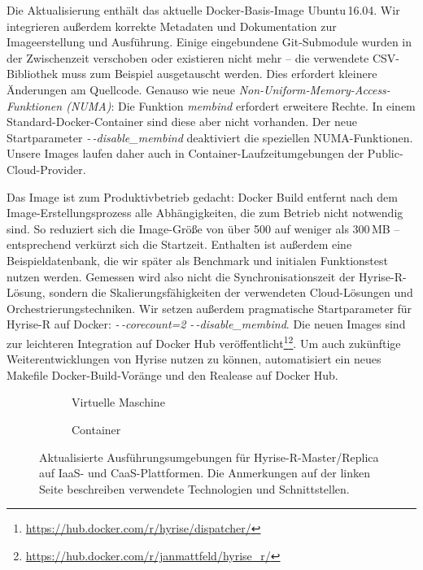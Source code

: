 Die Aktualisierung enthält das aktuelle Docker-Basis-Image Ubuntu\,16.04. Wir integrieren außerdem korrekte Metadaten und Dokumentation zur Imageerstellung und Ausführung. Einige eingebundene Git-Submodule wurden in der Zwischenzeit verschoben oder existieren nicht mehr -- die verwendete CSV-Bibliothek muss zum Beispiel ausgetauscht werden. Dies erfordert kleinere Änderungen am Quellcode. Genauso wie neue \emph{Non-Uniform-Memory-Access-Funktionen (NUMA)}: Die Funktion \emph{membind} erfordert erweitere Rechte. In einem Standard-Docker-Container sind diese aber nicht vorhanden. Der neue Startparameter \mbox{\emph{-\,-disable\_membind}} deaktiviert die speziellen NUMA-Funktionen. Unsere Images laufen daher auch in Container-Laufzeitumgebungen der Public-Cloud-Provider.

Das Image ist zum Produktivbetrieb gedacht: Docker Build entfernt nach dem Image-Erstellungsprozess alle Abhängigkeiten, die zum Betrieb nicht notwendig sind. So reduziert sich die Image-Größe von über 500 auf weniger als 300\,MB -- entsprechend verkürzt sich die Startzeit. Enthalten ist außerdem eine Beispieldatenbank, die wir später als Benchmark und initialen Funktionstest nutzen werden. Gemessen wird also nicht die Synchronisationszeit der Hyrise-R-Lösung, sondern die Skalierungsfähigkeiten der verwendeten Cloud-Lösungen und Orchestrierungstechniken. Wir setzen außerdem pragmatische Startparameter für Hyrise-R auf Docker: \emph{-\,-corecount=2} \emph{-\,-disable\_membind}. Die neuen Images sind zur leichteren Integration auf Docker Hub veröffentlicht\footnote{\url{https://hub.docker.com/r/hyrise/dispatcher/}}\footnote{\url{https://hub.docker.com/r/janmattfeld/hyrise_r/}}. Um auch zukünftige Weiterentwicklungen von Hyrise nutzen zu können, automatisiert ein neues Makefile Docker-Build-Voränge und den Realease auf Docker Hub.

\begin{figure}[ht]
	\centering
	\begin{subfigure}[b]{0.45\textwidth}
		\def\svgwidth{\linewidth}
		{\scriptsize \textsf{
				}}
		\caption{Virtuelle Maschine}
		\label{fig:sub:hyrise-r-runtime-vm}
	\end{subfigure}\hfill%
	\begin{subfigure}[b]{0.45\textwidth}
		\def\svgwidth{\linewidth}
		{\scriptsize \textsf{
				}}
		\caption{Container}
		\label{fig:sub:hyrise-r-runtime-docker}
	\end{subfigure}	
	\caption{Aktualisierte Ausführungsumgebungen für Hyrise-R-Master/Replica auf IaaS- und CaaS-Plattformen. Die Anmerkungen auf der linken Seite beschreiben verwendete Technologien und Schnittstellen.}
	\label{fig:hyrise-r-runtimes}
\end{figure}

